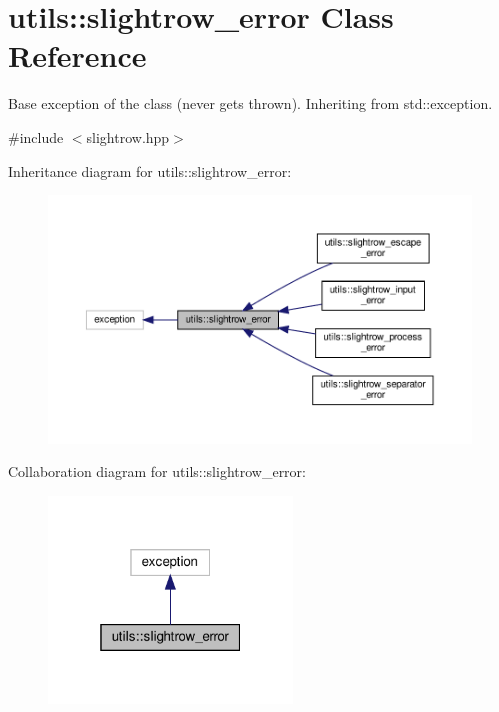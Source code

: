\hypertarget{classutils_1_1slightrow__error}{}\section{utils\+:\+:slightrow\+\_\+error Class Reference}
\label{classutils_1_1slightrow__error}


Base exception of the class (never gets thrown). Inheriting from std\+::exception.  




{\ttfamily \#include $<$slightrow.\+hpp$>$}



Inheritance diagram for utils\+:\+:slightrow\+\_\+error\+:
\nopagebreak
\begin{figure}[H]
\begin{center}
\leavevmode
\includegraphics[width=350pt]{classutils_1_1slightrow__error__inherit__graph}
\end{center}
\end{figure}


Collaboration diagram for utils\+:\+:slightrow\+\_\+error\+:
\nopagebreak
\begin{figure}[H]
\begin{center}
\leavevmode
\includegraphics[width=184pt]{classutils_1_1slightrow__error__coll__graph}
\end{center}
\end{figure}


